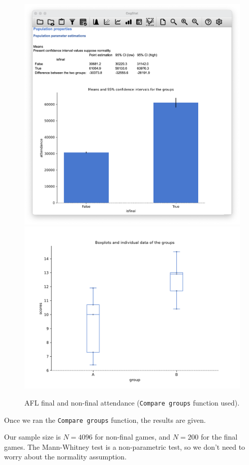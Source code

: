 \documentclass[
]{book}
\theoremstyle{definition}
\theoremstyle{definition}
\theoremstyle{definition}
\theoremstyle{definition}
\theoremstyle{remark}
\begin{document}
\begin{figure}

{\centering \includegraphics[width=0.66\linewidth]{resources/image/mannwhitneyafl24} \includegraphics[width=0.66\linewidth]{resources/image/mannwhitneyafl24box} 

}

\caption{AFL final and non-final attendance (\texttt{Compare\ groups} function used).}\label{fig:mwafl24}
\end{figure}

Once we ran the \texttt{Compare\ groups} function, the results are given.

Our sample size is \(N=4096\) for non-final games, and \(N=200\) for the final games. The Mann-Whitney test is a non-parametric test, so we don't need to worry about the normality assumption.
\end{document}
